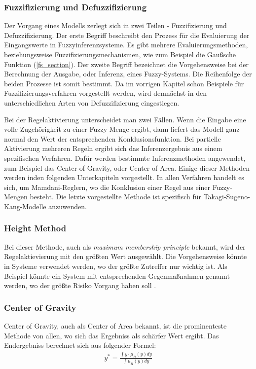 \subsubsection{Fuzzifizierung und Defuzzifizierung}\label{FDF} 

Der Vorgang eines Modells zerlegt sich in zwei Teilen - Fuzzifizierung und Defuzzifizierung. Der erste Begriff beschreibt den Prozess für die Evaluierung der Eingangswerte in Fuzzyinferenzsysteme. Es gibt mehrere Evaluierungsmethoden, beziehungsweise Fuzzifizierungsmechanismen, wie zum Beispiel die Gaußsche Funktion (\ref{fs_section}). Der zweite Begriff bezeichnet die Vorgehensweise bei der Berechnung der Ausgabe, oder Inferenz, eines Fuzzy-Systems. Die Reihenfolge der beiden Prozesse ist somit bestimmt. Da im vorrigen Kapitel schon Beispiele für Fuzzifizierungsverfahren vorgestellt werden, wird demnächst in den unterschiedlichen Arten von Defuzzifizierung eingestiegen.

Bei der Regelaktivierung unterscheidet man zwei Fällen. Wenn die Eingabe eine volle Zugehörigkeit zu einer Fuzzy-Menge ergibt, dann liefert das Modell ganz normal den Wert der entsprechenden Konklusionsfunktion. Bei partielle Aktivierung mehreren Regeln ergibt sich das Inferenzergebnis aus einem spezifischen Verfahren. Dafür werden bestimmte Inferenzmethoden angewendet, zum Beispiel das Center of Gravity, oder Center of Area. Einige dieser Methoden werden inden folgenden Unterkapiteln vorgestellt. In allen Verfahren handelt es sich, um Mamdani-Reglern, wo die Konklusion einer Regel aus einer Fuzzy-Mengen besteht. Die letzte vorgestellte Methode ist spezifisch für Takagi-Sugeno-Kang-Modelle anzuwenden.

\subsubsection{Height Method}
Bei dieser Methode, auch als \textit{maximum membership principle} bekannt, wird der Regelaktievierung mit den größten Wert ausgewählt. Die Vorgehensweise könnte in Systeme verwendet werden, wo der größte Zutreffer nur wichtig ist. Als Beispiel könnte ein System mit entsprechenden Gegenmaßnahmen genannt werden, wo der größte Risiko Vorgang haben soll \cite{SCTemassi:01}.

\subsubsection{Center of Gravity}

Center of Gravity, auch als Center of Area bekannt, ist die prominenteste Methode von allen, wo sich das Ergebniss als schärfer Wert ergibt. Das Endergebniss berechnet sich aus folgender Formel:
\begin{align}
y^* = \frac{\int y \cdot \mu_R(y)dy}{\int \mu_R(y)dy}
\end{align}


